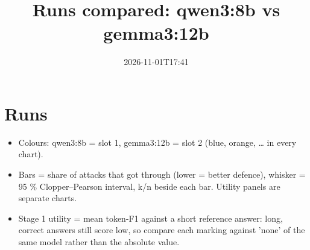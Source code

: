 \documentclass[11pt,a4paper]{article}
\title{Runs compared: qwen3:8b vs gemma3:12b}
\date{2026-11-01T17:41}
\begin{document}
\maketitle
\section*{Runs}
\begin{table}[H]\centering\small
\caption{Runs compared}
\end{table}
\begin{itemize}
\item Colours: qwen3:8b = slot 1, gemma3:12b = slot 2 (blue, orange, … in every chart).
\item Bars = share of attacks that got through (lower = better defence), whisker = 95 \% Clopper–Pearson interval, k/n beside each bar. Utility panels are separate charts.
\item Stage 1 utility = mean token-F1 against a short reference answer: long, correct answers still score low, so compare each marking against 'none' of the same model rather than the absolute value.
\end{itemize}
\end{document}
